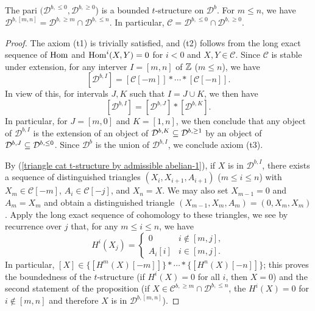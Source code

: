 \begin{proposition}\label{triangle cat t-structure by admissible abelian}
The pari $(\mathcal{D}^{b,\leq 0},\mathcal{D}^{b,\geq 0}$) is a bounded $t$-structure on $\mathcal{D}^{b}$. For $m\leq n$, we have $\mathcal{D}^{b,[m,n]}=\mathcal{D}^{b,\geq m}\cap\mathcal{D}^{b,\leq n}$. In particular, $\mathcal{C}=\mathcal{D}^{b,\leq 0}\cap\mathcal{D}^{b,\geq 0}$.
\end{proposition}
\begin{proof}
The axiom (t1) is trivially satisfied, and (t2) follows from the long exact sequence of $\mathrm{Hom}$ and $\mathrm{Hom}^i(X,Y)=0$ for $i<0$ and $X,Y\in\mathcal{C}$. Since $\mathcal{C}$ is stable under extension, for any interver $I=[m,n]$ of $\mathbb{Z}$ ($m\leq n$), we have
\begin{equation}\label{triangle cat t-structure by admissible abelian-1}
[\mathcal{D}^{b,I}]=[\mathcal{C}[-m]]\ast\cdots\ast[\mathcal{C}[-n]].
\end{equation}
In view of this, for intervals $J,K$ such that $I=J\cup K$, we then have
\begin{equation}\label{triangle cat t-structure by admissible abelian-2}
[\mathcal{D}^{b,I}]=[\mathcal{D}^{b,J}]\ast[\mathcal{D}^{b,K}].
\end{equation}
In particular, for $J=[m,0]$ and $K=[1,n]$, we then conclude that any object of $\mathcal{D}^{b,I}$ is the extension of an object of $\mathcal{D}^{b,K}\subseteq\mathcal{D}^{b,\geq 1}$ by an object of $\mathcal{D}^{b,J}\subseteq\mathcal{D}^{b,\leq 0}$. Since $\mathcal{D}^b$ is the union of $\mathcal{D}^{b,I}$, we conclude axiom (t3).\par
By (\ref{triangle cat t-structure by admissible abelian-1}), if $X$ is in $\mathcal{D}^{b,I}$, there exists a sequence of distinguished triangles $(X_i,X_{i+1},A_{i+1})$ ($m\leq i\leq n$) with $X_m\in\mathcal{C}[-m]$, $A_i\in\mathcal{C}[-j]$, and $X_n=X$. We may also set $X_{m-1}=0$ and $A_m=X_m$ and obtain a distinguished triangle $(X_{m-1},X_m,A_m)=(0,X_m,X_m)$. Apply the long exact sequence of cohomology to these triangles, we see by recurrence over $j$ that, for any $m\leq i\leq n$, we have
\[H^i(X_j)=\begin{cases}
0&i\notin[m,j],\\
A_i[i]&i\in[m,j].
\end{cases}\]
In particular, $[X]\in\{[H^m(X)[-m]]\}\ast\cdots\ast\{[H^n(X)[-n]]\}$; this proves the boundedness of the $t$-structure (if $H^i(X)=0$ for all $i$, then $X=0$) and the second statement of the proposition (if $X\in\mathcal{C}^{b,\geq m}\cap\mathcal{D}^{b,\leq n}$, the $H^i(X)=0$ for $i\notin[m,n]$ and therefore $X$ is in $\mathcal{D}^{b,[m,n]}$).
\end{proof}

